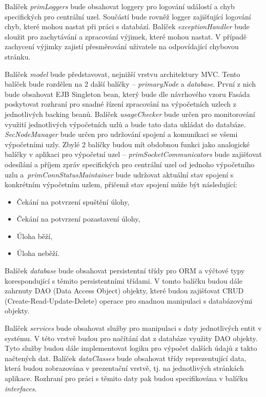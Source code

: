 Balíček \textit{primLoggers} bude obsahovat loggery pro logování událostí a chyb specifických pro centrální uzel. Součástí bude rovněž logger zajišťující logování chyb, které mohou nastat při práci s databází. Balíček \textit{exceptionHandler} bude sloužit pro zachytávání a zpracování výjimek, které mohou nastat. V případě zachycení výjimky zajistí přesměrování uživatele na odpovídající chybovou stránku.

Balíček \textit{model} bude představovat, nejnižší vrstvu architektury MVC. Tento balíček bude rozdělen na 2 další balíčky -- \textit{primaryNode} a \textit{database}. První z nich bude obsahovat EJB Singleton bean, který bude dle návrhového vzoru Fasáda poskytovat rozhraní pro snadné řízení zpracování na výpočetních uzlech z jednotlivých backing beanů. Balíček \textit{usageChecker} bude určen pro monitorování využití jednotlivých výpočetních uzlů a bude tato data ukládat do databáze. \textit{SecNodeManager} bude určen pro udržování spojení a komunikaci se všemi výpočetními uzly. Zbylé 2 balíčky budou mít obdobnou funkci jako analogické balíčky v aplikaci pro výpočetní uzel -- \textit{primSocketCommunicators} bude zajišťovat odesílání a příjem zpráv specifických pro centrální uzel od jednoho výpočetního uzlu a~\textit{primConnStatusMaintainer} bude udržovat aktuální stav spojení s konkrétním výpočetním uzlem, přičemž stav spojení může být následující:

\begin{itemize}
    \item Čekání na potvrzení spuštění úlohy,
    \item Čekání na potvrzení pozastavení úlohy,
    \item Úloha běží,
    \item Úloha neběží.
\end{itemize}
Balíček \textit{database} bude obsahovat persistentní třídy pro ORM a výčtové typy korespondující s těmito persistentními třídami. V tomto balíčku budou dále zahrnuty  DAO (Data Access Object) objekty, které budou zajišťovat CRUD (Create-Read-Update-Delete) operace pro snadnou manipulaci s databázovými objekty.

Balíček \textit{services} bude obsahovat služby pro manipulaci s daty jednotlivých entit v systému. V této vrstvě budou pro načítání dat z databáze využity DAO objekty. Tyto služby budou dále implementovat logiku pro výpočet dalších údajů z takto načtených dat. Balíček \textit{dataClasses} bude obsahovat třídy reprezentující data, která budou zobrazována v prezentační vrstvě, tj. na jednotlivých stránkách aplikace. Rozhraní pro práci s těmito daty pak budou specifikována v balíčku \textit{interfaces}.

